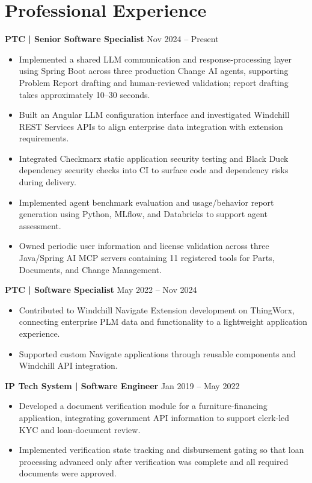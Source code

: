 \documentclass[a4paper,10pt]{article}
\begin{document}
\section{Professional Experience}
\textbf{PTC | Senior Software Specialist} \hfill Nov 2024 -- Present
\begin{itemize}
  \item Implemented a shared LLM communication and response-processing layer using Spring Boot across three production Change AI agents, supporting Problem Report drafting and human-reviewed validation; report drafting takes approximately 10--30 seconds.
  \item Built an Angular LLM configuration interface and investigated Windchill REST Services APIs to align enterprise data integration with extension requirements.
  \item Integrated Checkmarx static application security testing and Black Duck dependency security checks into CI to surface code and dependency risks during delivery.
  \item Implemented agent benchmark evaluation and usage/behavior report generation using Python, MLflow, and Databricks to support agent assessment.
  \item Owned periodic user information and license validation across three Java/Spring AI MCP servers containing 11 registered tools for Parts, Documents, and Change Management.
\end{itemize}

\textbf{PTC | Software Specialist} \hfill May 2022 -- Nov 2024
\begin{itemize}
  \item Contributed to Windchill Navigate Extension development on ThingWorx, connecting enterprise PLM data and functionality to a lightweight application experience.
  \item Supported custom Navigate applications through reusable components and Windchill API integration.
\end{itemize}

\textbf{IP Tech System | Software Engineer} \hfill Jan 2019 -- May 2022
\begin{itemize}
  \item Developed a document verification module for a furniture-financing application, integrating government API information to support clerk-led KYC and loan-document review.
  \item Implemented verification state tracking and disbursement gating so that loan processing advanced only after verification was complete and all required documents were approved.
\end{itemize}
\end{document}
